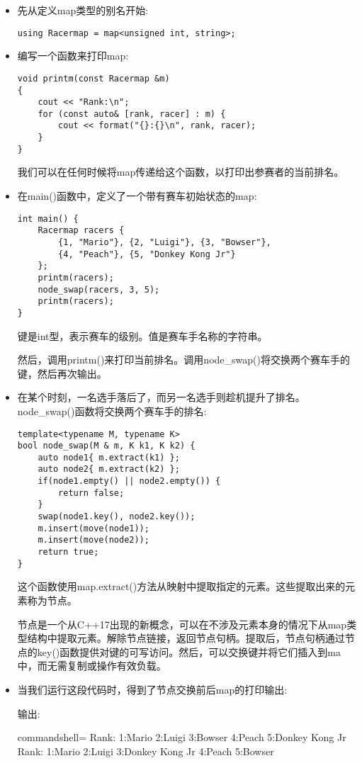 \begin{itemize}
\item 
先从定义map类型的别名开始:

\begin{lstlisting}[style=styleCXX]
using Racermap = map<unsigned int, string>;
\end{lstlisting}

\item 
编写一个函数来打印map:

\begin{lstlisting}[style=styleCXX]
void printm(const Racermap &m)
{
	cout << "Rank:\n";
	for (const auto& [rank, racer] : m) {
		cout << format("{}:{}\n", rank, racer);
	}
}
\end{lstlisting}

我们可以在任何时候将map传递给这个函数，以打印出参赛者的当前排名。

\item 
在main()函数中，定义了一个带有赛车初始状态的map:

\begin{lstlisting}[style=styleCXX]
int main() {
	Racermap racers {
		{1, "Mario"}, {2, "Luigi"}, {3, "Bowser"},
		{4, "Peach"}, {5, "Donkey Kong Jr"}
	};
	printm(racers);
	node_swap(racers, 3, 5);
	printm(racers);
}
\end{lstlisting}

键是int型，表示赛车的级别。值是赛车手名称的字符串。

然后，调用printm()来打印当前排名。调用node\_swap()将交换两个赛车手的键，然后再次输出。

\item 
在某个时刻，一名选手落后了，而另一名选手则趁机提升了排名。node\_swap()函数将交换两个赛车手的排名:

\begin{lstlisting}[style=styleCXX]
template<typename M, typename K>
bool node_swap(M & m, K k1, K k2) {
	auto node1{ m.extract(k1) };
	auto node2{ m.extract(k2) };
	if(node1.empty() || node2.empty()) {
		return false;
	}
	swap(node1.key(), node2.key());
	m.insert(move(node1));
	m.insert(move(node2));
	return true;
}
\end{lstlisting}

这个函数使用map.extract()方法从映射中提取指定的元素。这些提取出来的元素称为节点。

节点是一个从C++17出现的新概念，可以在不涉及元素本身的情况下从map类型结构中提取元素。解除节点链接，返回节点句柄。提取后，节点句柄通过节点的key()函数提供对键的可写访问。然后，可以交换键并将它们插入到ma中，而无需复制或操作有效负载。

\item 
当我们运行这段代码时，得到了节点交换前后map的打印输出:

输出:

\begin{tcblisting}{commandshell={}}
Rank:
1:Mario
2:Luigi
3:Bowser
4:Peach
5:Donkey Kong Jr
Rank:
1:Mario
2:Luigi
3:Donkey Kong Jr
4:Peach
5:Bowser
\end{tcblisting}
\end{itemize}

